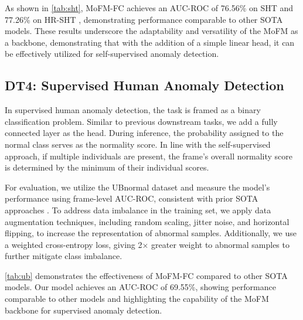 As shown in \cref{tab:sht}, MoFM-FC achieves an AUC-ROC of 76.56\% on SHT \cite{liu2018future} and 77.26\% on HR-SHT \cite{morais2019learning}, demonstrating performance comparable to other SOTA models. These results underscore the adaptability and versatility of the MoFM as a backbone, demonstrating that with the addition of a simple linear head, it can be effectively utilized for self-supervised anomaly detection.

\subsection{DT4: Supervised Human Anomaly Detection}
\label{sec:sup_anomaly}
In supervised human anomaly detection, the task is framed as a binary classification problem. Similar to previous downstream tasks, we add a fully connected layer as the head. During inference, the probability assigned to the normal class serves as the normality score. In line with the self-supervised approach, if multiple individuals are present, the frame's overall normality score is determined by the minimum of their individual scores.



For evaluation, we utilize the UBnormal dataset \cite{Acsintoae_CVPR_2022} and measure the model's performance using frame-level AUC-ROC, consistent with prior SOTA approaches \cite{georgescu2021background, bertasius2021space, yan2018spatial, shi2019two, cheng2020skeleton, liu2020disentangling, hirschorn2023normalizing}. To address data imbalance in the training set, we apply data augmentation techniques, including random scaling, jitter noise, and horizontal flipping, to increase the representation of abnormal samples. Additionally, we use a weighted cross-entropy loss, giving 2$\times$ greater weight to abnormal samples to further mitigate class imbalance.

\cref{tab:ub} demonstrates the effectiveness of MoFM-FC compared to other SOTA models. Our model achieves an AUC-ROC of 69.55\%, showing performance comparable to other models and highlighting the capability of the MoFM backbone for supervised anomaly detection.

